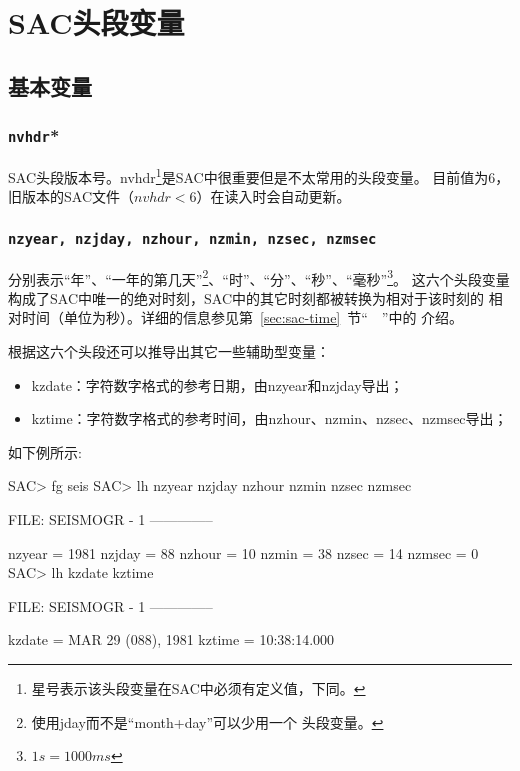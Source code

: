 \section{SAC头段变量}
\label{sec:sac-header-variables}

\subsection{基本变量}

\subsubsection{\texttt{nvhdr}*}
SAC头段版本号。nvhdr\footnote{星号表示该头段变量在SAC中必须有定义值，下同。}是SAC中很重要但是不太常用的头段变量。
目前值为6，旧版本的SAC文件（$nvhdr<6$）在读入时会自动更新。

\subsubsection{\texttt{nzyear, nzjday, nzhour, nzmin, nzsec, nzmsec}}
分别表示``年''、``一年的第几天''\footnote{使用jday而不是``month+day''可以少用一个
头段变量。}、``时''、``分''、``秒''、``毫秒''\footnote{$1 s = 1000 ms$}。
这六个头段变量构成了SAC中唯一的绝对时刻，SAC中的其它时刻都被转换为相对于该时刻的
相对时间（单位为秒）。详细的信息参见第~\ref{sec:sac-time}~节``~~''中的
介绍。

根据这六个头段还可以推导出其它一些辅助型变量：
\begin{itemize}
\ttfamily
\item kzdate：字符数字格式的参考日期，由nzyear和nzjday导出；
\item kztime：字符数字格式的参考时间，由nzhour、nzmin、nzsec、nzmsec导出；
\end{itemize}

如下例所示:
\begin{SACCode}
SAC> fg seis
SAC> lh nzyear nzjday nzhour nzmin nzsec nzmsec
  
  FILE: SEISMOGR - 1
 --------------

     nzyear = 1981
     nzjday = 88
     nzhour = 10
      nzmin = 38
      nzsec = 14
     nzmsec = 0
SAC> lh kzdate kztime 
  
  FILE: SEISMOGR - 1
 --------------

     kzdate = MAR 29 (088), 1981
     kztime = 10:38:14.000
\end{SACCode}

